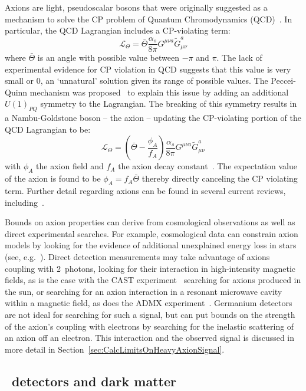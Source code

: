 	Axions are light, pseudoscalar bosons that were originally suggested as a
mechanism to solve the CP problem of Quantum Chromodynamics (QCD)~\cite{Pec77}.  In particular, the QCD
Lagrangian includes a CP-violating term: \[
			\mathcal{L}_{\Theta} = \bar{\Theta} \frac{\alpha_s}{8 \pi} G^{\mu \nu a} \tilde{G}_{\mu \nu}^{a}
			\]
where $\bar{\Theta}$ is an angle with possible value between $-\pi$ and $\pi$.  The lack of experimental evidence for CP violation in QCD suggests that this value is very small or 0, an `unnatural' solution given its range of possible values.  The Peccei-Quinn mechanism was proposed~\cite{Pec77} to explain this issue by adding an additional $U(1)_{PQ}$ symmetry to the Lagrangian.  The breaking of this symmetry results in a Nambu-Goldstone boson -- the axion -- updating the CP-violating portion of the QCD Lagrangian to be:
			\[
			\mathcal{L}_{\Theta} = \left( \bar{\Theta} - \frac{\phi_{A}}{f_{A}}\right) \frac{\alpha_s}{8 \pi} G^{\mu \nu a} \tilde{G}_{\mu \nu}^{a}
			\]	
with $\phi_{A}$ the axion field and $f_{A}$ the axion decay constant~\cite{Amsler20081}.  The expectation value of the axion is found to be $\phi_{A} = f_{A} \bar{\Theta}$ thereby directly canceling the CP violating term.  Further detail regarding axions can be found in several current reviews, including~\cite{Amsler20081,2008LNP}.
	
	Bounds on axion properties can derive from cosmological observations as well as direct experimental searches.  For example, cosmological data can constrain axion models by looking for the evidence of additional unexplained energy loss in stars (see, e.g.~\cite{Gondolo09,Raffelt95}).  Direct detection measurements may take advantage of axions coupling with 2~photons, looking for their interaction in high-intensity magnetic fields, as is the case with the CAST experiment~\cite{Arik09} searching for axions produced in the sun, or searching for an axion interaction in a resonant microwave cavity within a magnetic field, as does the ADMX experiment~\cite{Asz10}.  Germanium detectors are not ideal for searching for such a signal, but can put bounds on the strength of the axion's coupling with electrons by searching for the inelastic scattering of an axion off an electron.  This interaction and the observed signal is discussed in more detail in Section~\ref{sec:CalcLimitsOnHeavyAxionSignal}.
		
		\subsection{\ppc~detectors and dark matter}

